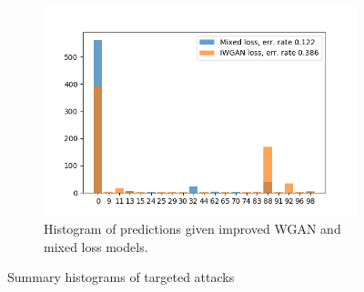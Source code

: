 \begin{figure}[t]
\begin{subfigure}[b]{0.4\textwidth}
        \includegraphics[width=\textwidth]{./fig/pred_comparisson_spk0.png}
        \caption{Histogram of predictions given improved WGAN and mixed loss models.}
        \label{fig:pred_comp_spk0}
    \end{subfigure}
    \caption{Summary histograms of targeted attacks}
    \label{fig:confusion_matrices}
\end{figure}
